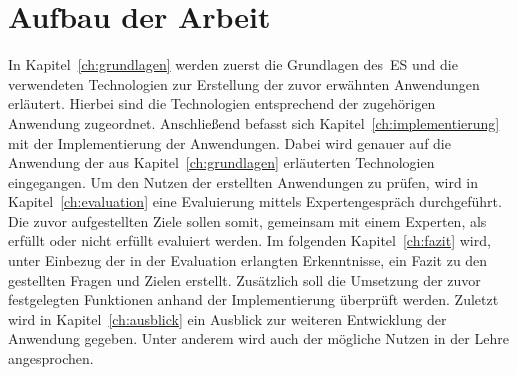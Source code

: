 \section{Aufbau der Arbeit}\label{sec:aufbau-der-arbeit}
In Kapitel~\ref{ch:grundlagen} werden zuerst die Grundlagen des~\ac{ES} und die verwendeten Technologien
zur Erstellung der zuvor erwähnten Anwendungen erläutert.
Hierbei sind die Technologien entsprechend der zugehörigen Anwendung zugeordnet.
Anschließend befasst sich Kapitel~\ref{ch:implementierung} mit der Implementierung der Anwendungen.
Dabei wird genauer auf die Anwendung der aus Kapitel~\ref{ch:grundlagen} erläuterten Technologien eingegangen.
Um den Nutzen der erstellten Anwendungen zu prüfen, wird in Kapitel~\ref{ch:evaluation} eine Evaluierung mittels Expertengespräch durchgeführt.
Die zuvor aufgestellten Ziele sollen somit, gemeinsam mit einem Experten, als erfüllt oder nicht erfüllt evaluiert werden.
Im folgenden Kapitel~\ref{ch:fazit} wird, unter Einbezug der in der Evaluation erlangten Erkenntnisse, ein Fazit zu den gestellten Fragen und Zielen erstellt.
Zusätzlich soll die Umsetzung der zuvor festgelegten Funktionen anhand der Implementierung überprüft werden.
Zuletzt wird in Kapitel~\ref{ch:ausblick} ein Ausblick zur weiteren Entwicklung der Anwendung gegeben.
Unter anderem wird auch der mögliche Nutzen in der Lehre angesprochen.
